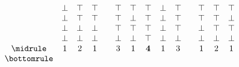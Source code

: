 \begin{myproof}
\begin{nlist}
\begin{gather*}
\begin{array}{c c c c c c c c c c c c c c c}
                & \bot & \top & \top & & \top & \top
                & \top
                & \bot & \top & & \top & \top & \top & \\
                & \bot & \top & \top & & \top & \bot
                & \top
                & \bot & \top & & \top & \top & \bot & \\
                & \bot & \bot & \bot & & \top & \top
                & \top
                & \bot & \top & & \bot & \top & \top & \\
                & \bot & \bot & \bot & & \bot & \bot
                & \top
                & \bot & \bot & & \bot & \bot & \bot & \\
                \midrule
                 & 1 & 2 & 1 &  & 3 & 1
                & \mathbf 4
                & 1 & 3 & & 1 & 2 & 1 \\ \bottomrule
            \end{array}
        \end{gather*}


\end{nlist}
\end{myproof}
